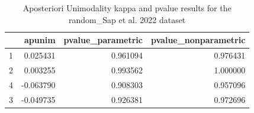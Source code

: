 \begin{table}
\caption{Aposteriori Unimodality kappa and pvalue results for the random_Sap et al. 2022 dataset}
\label{tab:results_random_sap}
\begin{tabular}{lrrr}
\toprule
 & apunim & pvalue\_parametric & pvalue\_nonparametric \\
\midrule
1 & 0.025431 & 0.961094 & 0.976431 \\
2 & 0.003255 & 0.993562 & 1.000000 \\
4 & -0.063790 & 0.908303 & 0.957096 \\
3 & -0.049735 & 0.926381 & 0.972696 \\
\bottomrule
\end{tabular}
\end{table}
